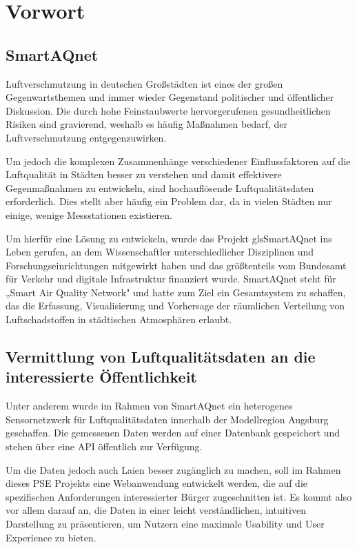 \section{Vorwort}

\subsection*{\gls{SmartAQnet}}
Luftverschmutzung in deutschen Großstädten ist eines der großen Gegenwartsthemen und immer wieder Gegenstand politischer und öffentlicher Diskussion. 
Die durch hohe Feinstaubwerte hervorgerufenen gesundheitlichen Risiken sind gravierend, weshalb es häufig Maßnahmen bedarf, der Luftverschmutzung 
entgegenzuwirken.

Um jedoch die komplexen Zusammenhänge verschiedener Einflussfaktoren auf die Luftqualität in Städten besser zu verstehen und damit effektivere 
Gegenmaßnahmen zu entwickeln, sind hochauflösende Luftqualitätsdaten erforderlich. Dies stellt aber häufig ein Problem dar, da in vielen Städten 
nur einige, wenige Messstationen existieren.

Um hierfür eine Lösung zu entwickeln, wurde das Projekt gls{SmartAQnet} ins Leben gerufen, an dem Wissenschaftler unterschiedlicher Disziplinen und 
Forschungseinrichtungen mitgewirkt haben und das größtenteils vom Bundesamt für Verkehr und digitale Infrastruktur finanziert wurde. \gls{SmartAQnet} 
steht für „Smart Air Quality Network" und hatte zum Ziel ein Gesamtsystem zu schaffen, das die Erfassung, Visualisierung und Vorhersage der räumlichen 
Verteilung von Luftschadstoffen in städtischen Atmosphären erlaubt.

\subsection*{Vermittlung von Luftqualitätsdaten an die interessierte Öffentlichkeit}

Unter anderem wurde im Rahmen von \gls{SmartAQnet} ein heterogenes Sensornetzwerk für Luftqualitätsdaten innerhalb der Modellregion Augsburg geschaffen. 
Die gemessenen Daten werden auf einer Datenbank gespeichert und stehen über eine API öffentlich zur Verfügung.

Um die Daten jedoch auch Laien besser zugänglich zu machen, soll im Rahmen dieses PSE Projekts eine \gls{Webanwendung} entwickelt werden, die auf die 
spezifischen Anforderungen interessierter Bürger zugeschnitten ist. Es kommt also vor allem darauf an, die Daten in einer leicht verständlichen, 
intuitiven Darstellung zu präsentieren, um Nutzern eine maximale Usability und User Experience zu bieten.